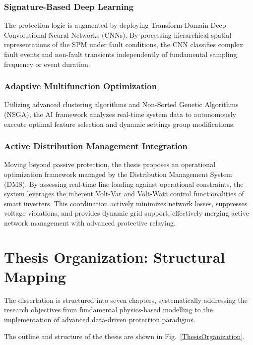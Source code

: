 
\subsubsection{Signature-Based Deep Learning}
The protection logic is augmented by deploying Transform-Domain Deep Convolutional Neural Networks (CNNs). By processing hierarchical spatial representations of the SPM under fault conditions, the CNN classifies complex fault events and non-fault transients independently of fundamental sampling frequency or event duration.
\subsubsection{Adaptive Multifunction Optimization}
Utilizing advanced clustering algorithms and Non-Sorted Genetic Algorithms (NSGA), the AI framework analyzes real-time system data to autonomously execute optimal feature selection and dynamic settings group modifications.
\subsubsection{Active Distribution Management Integration}
Moving beyond passive protection, the thesis proposes an operational optimization framework managed by the Distribution Management System (DMS). By assessing real-time line loading against operational constraints, the system leverages the inherent Volt-Var and Volt-Watt control functionalities of smart inverters. This coordination actively minimizes network losses, suppresses voltage violations, and provides dynamic grid support, effectively merging active network management with advanced protective relaying.


\section{Thesis Organization: Structural Mapping }

The dissertation is structured into seven chapters, systematically addressing the research objectives from fundamental physics-based modelling to the implementation of advanced data-driven protection paradigms.

The outline and structure of the thesis are shown in Fig.~\ref{ThesisOrganization}.

